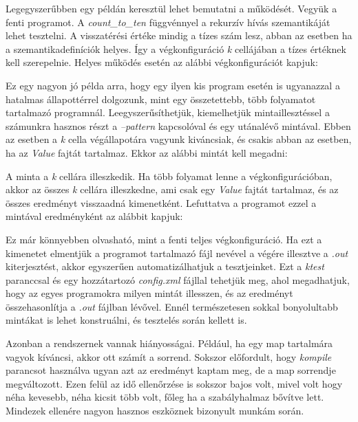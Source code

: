 

Legegyszerűbben egy példán keresztül lehet bemutatni a működését. Vegyük a fenti programot. A \textit{count\_to\_ten} függvénnyel a rekurzív hívás szemantikáját lehet tesztelni. A visszatérési értéke mindig a tízes szám lesz, abban az esetben ha a szemantikadefiníciók helyes. Így a végkonfiguráció \textit{k} cellájában a tízes értéknek kell szerepelnie. Helyes működés esetén az alábbi végkonfigurációt kapjuk:



Ez egy nagyon jó példa arra, hogy egy ilyen kis program esetén is ugyanazzal a hatalmas állapottérrel dolgozunk, mint egy összetettebb, több folyamatot tartalmazó programnál. Leegyszerűsíthetjük, kiemelhetjük mintaillesztéssel a számunkra hasznos részt a \textit{--pattern} kapcsolóval és egy utánalévő mintával. Ebben az esetben a \textit{k} cella végállapotára vagyunk kiváncsiak, és csakis abban az esetben, ha az \textit{Value} fajtát tartalmaz. Ekkor az alábbi mintát kell megadni:



A minta a \textit{k} cellára illeszkedik. Ha több folyamat lenne a végkonfigurációban, akkor az összes \textit{k} cellára illeszkedne, ami csak egy \textit{Value} fajtát tartalmaz, és az összes eredményt visszaadná kimenetként. Lefuttatva a programot ezzel a mintával eredményként az alábbit kapjuk:



Ez már könnyebben olvasható, mint a fenti teljes végkonfiguráció. Ha ezt a kimenetet elmentjük a programot tartalmazó fájl nevével a végére illesztve a \textit{.out} kiterjesztést, akkor egyszerűen automatizálhatjuk a tesztjeinket. Ezt a \textit{ktest} paranccsal és egy hozzátartozó \textit{config.xml} fájllal tehetjük meg, ahol megadhatjuk, hogy az egyes programokra milyen mintát illesszen, és az eredményt összehasonlítja a \textit{.out} fájlban lévővel. Ennél természetesen sokkal bonyolultabb mintákat is lehet konstruálni, és tesztelés során kellett is.

Azonban a rendszernek vannak hiányosságai. Például, ha egy map tartalmára vagyok kíváncsi, akkor ott számít a sorrend. Sokszor előfordult, hogy \textit{kompile} parancsot használva ugyan azt az eredményt kaptam meg, de a map sorrendje megváltozott. Ezen felül az idő ellenőrzése is sokszor bajos volt, mivel volt hogy néha kevesebb, néha kicsit több volt, főleg ha a szabályhalmaz bővítve lett. Mindezek ellenére nagyon hasznos eszköznek bizonyult munkám során.

